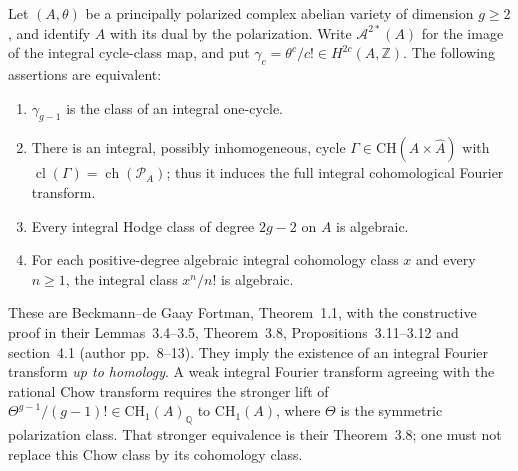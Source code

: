\begin{proposition}
Let $(A,\theta)$ be a principally polarized complex abelian variety
of dimension $g\ge2$, and identify $A$ with its dual by the
polarization.  Write $\mathcal A^{2*}(A)$ for the image of the
integral cycle-class map, and put
$\gamma_c=\theta^c/c!\in H^{2c}(A,\mathbb Z)$.
The following assertions are equivalent:
\begin{enumerate}
\item $\gamma_{g-1}$ is the class of an integral one-cycle.
\item There is an integral, possibly inhomogeneous, cycle
$\Gamma\in\mathrm{CH}(A\times\widehat A)$ with
$\operatorname{cl}(\Gamma)=\operatorname{ch}(\mathcal P_A)$;
thus it induces the full integral cohomological Fourier transform.
\item Every integral Hodge class of degree $2g-2$ on $A$ is
algebraic.
\item For each positive-degree algebraic integral cohomology
class $x$ and every $n\ge1$, the integral class $x^n/n!$ is
algebraic.
\end{enumerate}
These are Beckmann--de Gaay Fortman, Theorem~1.1,
with the constructive proof in their Lemmas~3.4--3.5,
Theorem~3.8, Propositions~3.11--3.12 and section~4.1
(author pp.~8--13).  They imply the existence of an integral
Fourier transform \emph{up to homology}.  A weak integral
Fourier transform agreeing with the rational Chow transform
requires the stronger lift of
$\Theta^{g-1}/(g-1)!\in\mathrm{CH}_1(A)_{\mathbb Q}$ to
$\mathrm{CH}_1(A)$, where $\Theta$ is the symmetric polarization
class.  That stronger equivalence is their Theorem~3.8;
one must not replace this Chow class by its cohomology class.
\end{proposition}
